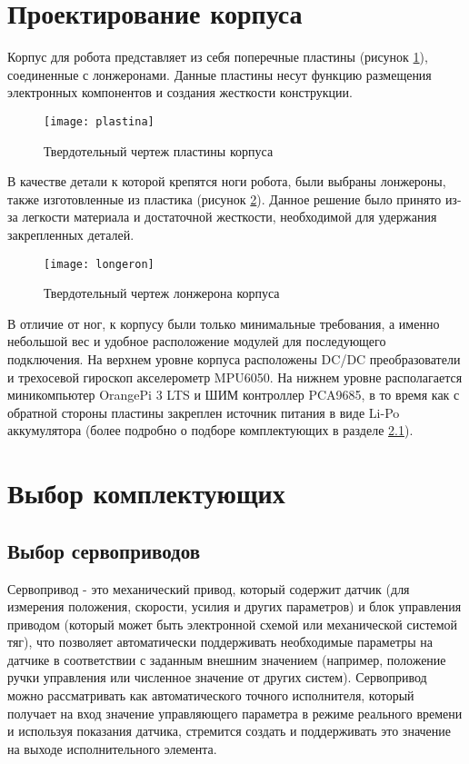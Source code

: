 \newpage
\section{Проектирование корпуса}\label{C4_3}

Корпус для робота представляет из себя поперечные пластины (рисунок \ref{plastina}), соединенные с лонжеронами. Данные пластины несут функцию размещения электронных компонентов и создания жесткости конструкции. 

\begin{figure}[h!]
	\begin{center}
		\texttt{[image: plastina]}
		\caption{Твердотельный чертеж пластины корпуса}
		\label{plastina}
	\end{center}
\end{figure}

В качестве детали к которой крепятся ноги робота, были выбраны лонжероны, также изготовленные из пластика (рисунок \ref{longeron}). Данное решение было принято из-за легкости материала и достаточной жесткости, необходимой для удержания закрепленных деталей. 

\begin{figure}[h!]
	\begin{center}
		\texttt{[image: longeron]}
		\caption{Твердотельный чертеж лонжерона корпуса}
		\label{longeron}
	\end{center}
\end{figure}
\pagebreak
В отличие от ног, к корпусу были только минимальные требования, а именно небольшой вес и удобное расположение модулей для последующего подключения. На верхнем уровне корпуса расположены DC/DC преобразователи и трехосевой гироскоп акселерометр MPU6050. На нижнем уровне располагается миникомпьютер OrangePi 3 LTS и ШИМ контроллер PCA9685, в то время как с обратной стороны пластины закреплен источник питания в виде Li-Po аккумулятора (более подробно о подборе комплектующих в разделе \ref{C4_4_1}).


\section{Выбор комплектующих}\label{C4_4}
	\subsection{Выбор сервоприводов}\label{C4_4_1}
	
Сервопривод - это механический привод, который содержит датчик (для измерения положения, скорости, усилия и других параметров) и блок управления приводом (который может быть электронной схемой или механической системой тяг), что позволяет автоматически поддерживать необходимые параметры на датчике в соответствии с заданным внешним значением (например, положение ручки управления или численное значение от других систем). Сервопривод можно рассматривать как автоматического точного исполнителя, который получает на вход значение управляющего параметра в режиме реального времени и используя показания датчика, стремится создать и поддерживать это значение на выходе исполнительного элемента. 

